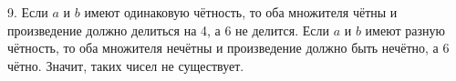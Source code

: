 9. Если $a$ и $b$ имеют одинаковую чётность, то оба множителя чётны и произведение должно делиться на 4, а 6 не делится. Если
$a$ и $b$ имеют разную чётность, то оба множителя нечётны и произведение должно быть нечётно, а 6 чётно. Значит, таких чисел не существует.\\
